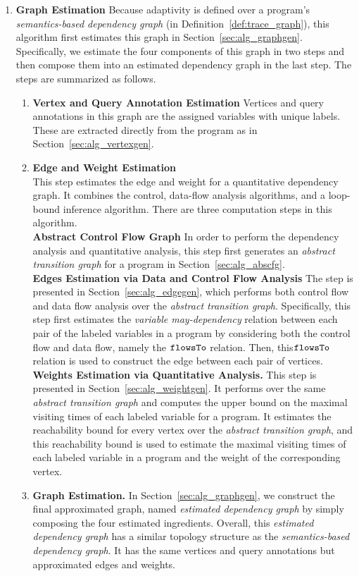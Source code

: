 \begin{enumerate}
 \item \textbf{Graph Estimation}
 Because adaptivity is defined over a program's \emph{semantics-based dependency graph} (in Definition~\ref{def:trace_graph}),
 this algorithm first estimates this graph
 in Section~\ref{sec:alg_graphgen}.
 Specifically, we estimate the four components of this graph in two steps and then compose them into an estimated dependency graph
 in the last step.
 The steps are summarized as follows.
\begin{enumerate}
 \item \textbf{Vertex and Query Annotation Estimation}
 Vertices and query annotations in this graph are the assigned variables with unique labels. These are extracted directly from the program as in Section~\ref{sec:alg_vertexgen}.
 \item \textbf{Edge and Weight Estimation}
 \\
 This step estimates the edge and weight for a quantitative dependency graph. It combines the control, data-flow analysis algorithms, and a loop-bound inference algorithm.
 There are three computation steps in this algorithm.
 \\
 \textbf{Abstract Control Flow Graph}
 In order to perform the dependency analysis and quantitative analysis, this step first generates an \emph{abstract transition graph} for a program in Section~\ref{sec:alg_abscfg}.
 \\
 \textbf{Edges Estimation via Data and Control Flow Analysis} 
 The step is presented in
 Section~\ref{sec:alg_edgegen}, which performs 
 both control flow and data flow analysis over the \emph{abstract transition graph}.
 Specifically, this step first estimates the \emph{variable may-dependency} relation between each pair of the labeled variables in a program by considering both the control flow and data flow, namely the $\mathtt{flowsTo}$ relation.
 Then, this$\mathtt{flowsTo}$ relation is used to construct the edge
 between each pair of vertices.
 \\
 \textbf{Weights Estimation via Quantitative Analysis.} 
 This step is presented in Section~\ref{sec:alg_weightgen}. 
 It performs over the same \emph{abstract transition graph} and computes the upper bound on the maximal visiting times of each labeled variable for a program.
 It estimates the reachability bound for every vertex over the \emph{abstract transition graph},
 and this reachability bound is used to estimate the maximal visiting times of each labeled variable in a program and the weight of the corresponding vertex.
\item \textbf{Graph Estimation.} 
In Section~\ref{sec:alg_graphgen}, we construct the final approximated graph,
named \emph{estimated dependency graph} by simply composing the four estimated ingredients. 
Overall, this \emph{estimated dependency graph} has a similar topology structure as 
the \emph{semantics-based dependency graph}. It has the same
vertices and query annotations but approximated edges and weights. 
\end{enumerate}


\end{enumerate}
